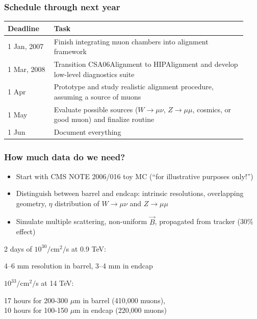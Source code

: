 \documentclass[compress]{beamer}
\begin{document}
\begin{frame}
\frametitle{Schedule through next year}

\renewcommand{\arraystretch}{1.5}
\begin{tabular}{p{0.18\linewidth} p{0.75\linewidth}}
Deadline & Task \\ \hline

1 Jan, \hfill 2007 & Finish integrating muon chambers into alignment framework \\

1 Mar, \hfill 2008 & Transition CSA06Alignment to HIPAlignment and
develop low-level diagnostics suite \\

1 Apr & Prototype and study realistic alignment procedure, assuming a
source of muons \\
 
1 May & Evaluate possible sources ($W\to\mu\nu$, $Z\to\mu\mu$,
cosmics, or good muon) and finalize routine \\

1 Jun & Document everything
\end{tabular}
\end{frame}

\begin{frame}
\frametitle{How much data do we need?}

\begin{itemize}
\item Start with CMS NOTE 2006/016 toy MC (``for illustrative purposes only!'')
\item Distinguish between barrel and endcap: intrinsic resolutions,
overlapping geometry, $\eta$ distribution of $W\to\mu\nu$ and $Z\to\mu\mu$
\item Simulate multiple scattering, non-uniform $\vec{B}$, propagated
from tracker (30\% effect)
\end{itemize}

\vfill
2 days of $10^{30}/$cm$^2/$s at 0.9 TeV:

\vspace{-0.25 cm}
\begin{center}
4--6 mm resolution in barrel, 3--4 mm in endcap
\end{center}

\vfill
$10^{33}/$cm$^2/$s at 14 TeV:

\vspace{-0.25 cm}
\begin{center}
17 hours for 200-300 $\mu$m in barrel (410,000 muons), \\ 10 hours for 100-150 $\mu$m in endcap (220,000 muons)
\end{center}
\end{frame}
\end{document}
